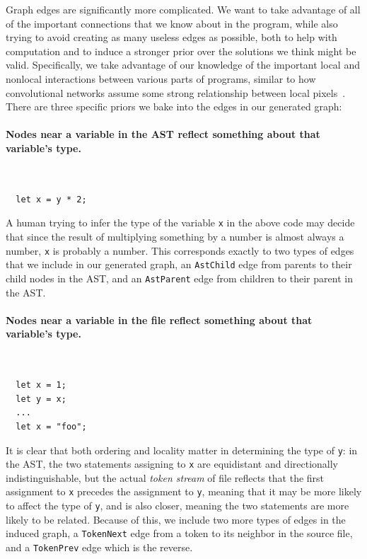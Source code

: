 Graph edges are significantly more complicated.
We want to take advantage of all of the important connections that we know about in the program, while also trying to avoid creating as many useless edges as possible, both to help with computation and to induce a stronger prior over the solutions we think might be valid.
Specifically, we take advantage of our knowledge of the important local and nonlocal interactions between various parts of programs, similar to how convolutional networks assume some strong relationship between local pixels~\cite{henaff2015deep}.
There are three specific priors we bake into the edges in our generated graph:

\paragraph{Nodes near a variable in the AST reflect something about that variable's type.}\
\ %
\begin{lstlisting}
  let x = y * 2;
\end{lstlisting}
A human trying to infer the type of the variable \texttt{x} in the above code may decide that since the result of multiplying something by a number is almost always a number, \texttt{x} is probably a number.
This corresponds exactly to two types of edges that we include in our generated graph, an \texttt{AstChild} edge from parents to their child nodes in the AST, and an \texttt{AstParent} edge from children to their parent in the AST.

\par\paragraph{Nodes near a variable in the file reflect something about that variable's type.}
\ %
\begin{lstlisting}
  let x = 1;
  let y = x;
  ...
  let x = "foo";
\end{lstlisting}
It is clear that both ordering and locality matter in determining the type of \texttt{y}: in the AST, the two statements assigning to \texttt{x} are equidistant and directionally indistinguishable, but the actual \emph{token stream} of file reflects that the first assignment to \texttt{x} precedes the assignment to \texttt{y}, meaning that it may be more likely to affect the type of \texttt{y}, and is also closer, meaning the two statements are more likely to be related.
Because of this, we include two more types of edges in the induced graph, a \texttt{TokenNext} edge from a token to its neighbor in the source file, and a \texttt{TokenPrev} edge which is the reverse.


